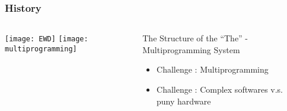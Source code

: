 \begin{frame}[plain]
	\frametitle{History}
	
	
	
	\begin{columns}
		
		\begin{column}{.4\textwidth}
			\centering
			\texttt{[image: EWD]}
			\texttt{[image: multiprogramming]}
			
			
			
		\end{column}
		
		\begin{column}{.6\textwidth}
			
			The Structure of the “The” - Multiprogramming System
			\begin{itemize}
				\item Challenge : Multiprogramming
				\item Challenge : Complex softwares v.s. puny hardware
				
			\end{itemize}	
			
		\end{column}
		
		
	\end{columns}
	
	
\end{frame}


